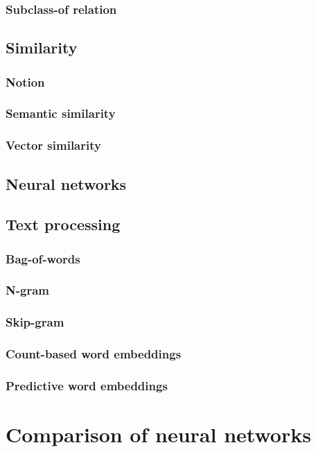 \documentclass[11pt]{scrartcl} %
\theoremstyle{definition}
\begin{document}
\subsubsection{Subclass-of relation}

\subsection{Similarity}

\subsubsection{Notion}
\subsubsection{Semantic similarity}
\subsubsection{Vector similarity}

\subsection{Neural networks}

\subsection{Text processing}

\subsubsection{Bag-of-words}
\subsubsection{N-gram}
\subsubsection{Skip-gram}
\subsubsection{Count-based word embeddings}
\subsubsection{Predictive word embeddings}

\section{Comparison of neural networks}
\end{document}

